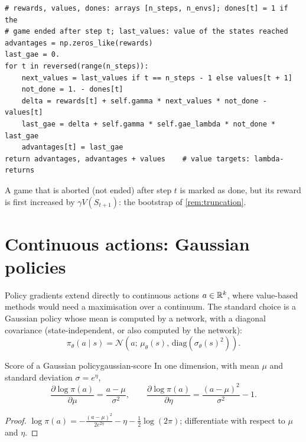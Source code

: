 \begin{lstlisting}[caption={GAE by the backward recursion
  (\code{algorithms.py}, \code{A2C.compute\_gae})}]
# rewards, values, dones: arrays [n_steps, n_envs]; dones[t] = 1 if the
# game ended after step t; last_values: value of the states reached
advantages = np.zeros_like(rewards)
last_gae = 0.
for t in reversed(range(n_steps)):
    next_values = last_values if t == n_steps - 1 else values[t + 1]
    not_done = 1. - dones[t]
    delta = rewards[t] + self.gamma * next_values * not_done - values[t]
    last_gae = delta + self.gamma * self.gae_lambda * not_done * last_gae
    advantages[t] = last_gae
return advantages, advantages + values    # value targets: lambda-returns
\end{lstlisting}
A game that is aborted (not ended) after step $t$ is marked as done, but
its reward is first increased by $\gamma V(S_{t+1})$: the bootstrap of
\cref{rem:truncation}.

\section{Continuous actions: Gaussian policies}
\label{sec:gaussian}

Policy gradients extend directly to continuous actions $a \in \mathbb{R}^k$, where
value-based methods would need a maximisation over a continuum. The
standard choice is a Gaussian policy whose mean is computed by a network,
with a diagonal covariance (state-independent, or also computed by the
network):
\begin{equation}
  \pi_\theta(a \mid s) = \mathcal{N}\left(a;\, \mu_\theta(s),\,
  \mathrm{diag}(\sigma_\theta(s)^2)\right).
\end{equation}

\begin{proposition}{Score of a Gaussian policy}{gaussian-score}
  In one dimension, with mean $\mu$ and standard deviation $\sigma =
  e^{\eta}$,
  \begin{equation}
    \frac{\partial \log \pi(a)}{\partial \mu} = \frac{a - \mu}{\sigma^2},
    \qquad
    \frac{\partial \log \pi(a)}{\partial \eta} = \frac{(a -
    \mu)^2}{\sigma^2} - 1.
  \end{equation}
\end{proposition}

\begin{proof}
  $\log \pi(a) = -\frac{(a - \mu)^2}{2 e^{2\eta}} - \eta - \frac{1}{2}
  \log(2\pi)$; differentiate with respect to $\mu$ and $\eta$.
\end{proof}

